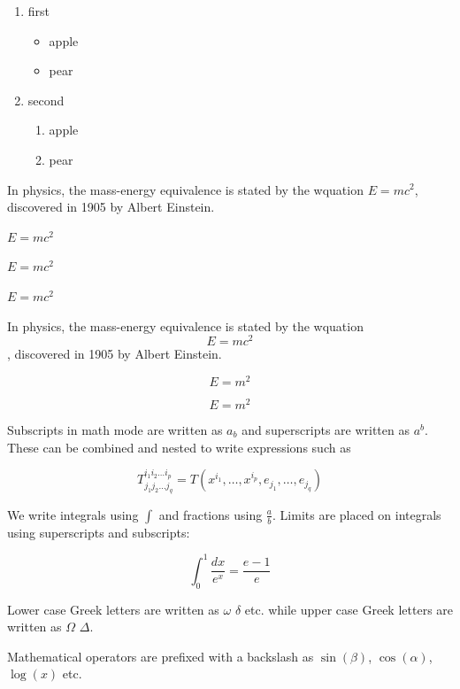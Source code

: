 \documentclass[12pt, a4paper]{article}
\begin{document}
\begin{enumerate}
    \item first
    \begin{itemize}
        \item apple
        \item pear
    \end{itemize}
    \item second
    \begin{enumerate}
        \item apple
        \item pear
    \end{enumerate}
\end{enumerate}


In physics, the mass-energy equivalence is stated
by the wquation $E=mc^2$, discovered in 1905 by Albert Einstein.

\(E=mc^2\)

$E=mc^2$

\begin{math}
    E=mc^2
\end{math}

In physics, the mass-energy equivalence is stated
by the wquation \[E=mc^2\], discovered in 1905 by Albert Einstein.

\begin{equation}
    E=m^2 %
\end{equation}

\begin{equation*}
    E=m^2 %
\end{equation*}

Subscripts in math mode are written as $a_b$ and superscripts are written as $a^b$. These can be combined and nested to write expressions such as

\[ T^{i_1 i_2 \dots i_p}_{j_1 j_2 \dots j_q} = T(x^{i_1},\dots,x^{i_p},e_{j_1},\dots,e_{j_q}) \]

We write integrals using $\int$ and fractions using $\frac{a}{b}$. Limits are placed on integrals using superscripts and subscripts:

\[ \int_0^1 \frac{dx}{e^x} =  \frac{e-1}{e} \]

Lower case Greek letters are written as $\omega$ $\delta$ etc. while upper case Greek letters are written as $\Omega$ $\Delta$.

Mathematical operators are prefixed with a backslash as $\sin(\beta)$, $\cos(\alpha)$, $\log(x)$ etc.
\end{document}
